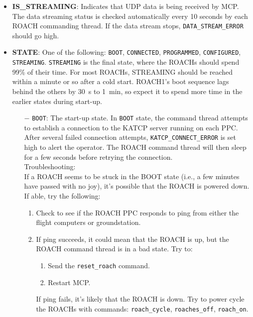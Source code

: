 \begin{itemize}[leftmargin=*,label={}]

\item \textbf{IS\_STREAMING}: Indicates that UDP data is being received by MCP\@. The data streaming status is checked automatically every 10 seconds by each ROACH commanding thread. If the data stream stops, \texttt{DATA\_STREAM\_ERROR} should go high.

\item \textbf{STATE}: One of the following: \texttt{BOOT}, \texttt{CONNECTED}, \texttt{PROGRAMMED}, \texttt{CONFIGURED}, \texttt{STREAMING}. \texttt{STREAMING} is the final state, where the ROACHs should spend 99\% of their time. For most ROACHs, STREAMING should be reached within a minute or so after a cold start. ROACH1’s boot sequence lags behind the others by 30~s to 1~min, so expect it to spend more time in the earlier states during start-up.

\begin{itemize}
    \item[$-$] \texttt{BOOT}: The start-up state. In \texttt{BOOT} state, the command thread attempts to establish a connection to the KATCP server running on each PPC\@. After several failed connection attempts, \texttt{KATCP\_CONNECT\_ERROR} is set high to alert the operator. The ROACH command thread will then sleep for a few seconds before retrying the connection.\\
    Troubleshooting:\\
    If a ROACH seems to be stuck in the BOOT state (i.e., a few minutes have passed with no joy), it’s possible that the ROACH is powered down. If able, try the following:
    \begin{enumerate}
      \item Check to see if the ROACH PPC responds to ping from either the flight computers or groundstation.
      \item If ping succeeds, it could mean that the ROACH is up, but the ROACH command thread is in a bad state. Try to:
        \begin{enumerate}
          \item Send the \texttt{reset\_roach} command.
          \item Restart MCP\@.
        \end{enumerate}
       If ping fails, it’s likely that the ROACH is down. Try to power cycle the ROACHs with commands: \texttt{roach\_cycle}, \texttt{roaches\_off}, \texttt{roach\_on}.
    \end{enumerate}


\end{itemize}
\end{itemize}
